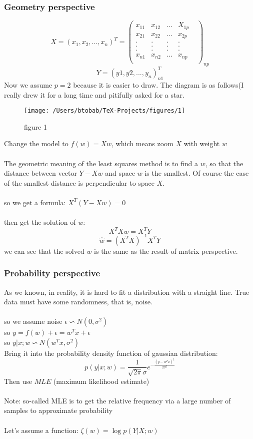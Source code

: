 \documentclass{report}
\begin{document}
\subsubsection{Geometry perspective}
$$
X=(x_1,x_2,...,x_n)^T=\begin{pmatrix}
x_{11}&x_{12}&...&X_{1p}\\
x_{21}&x_{22}&...&x_{2p}\\
.&.&.&.&\\
.&.&.&.&\\
.&.&.&.&\\
x_{n1}&x_{n2}&...&x_{np}\\
\end{pmatrix}_{np}
$$
$$
Y=(y1,y2,...,y_n)_{n1}^T
$$
Now we assume  $p=2$ because it is easier to draw. The diagram is as follows(I really drew it for a long time and pitifully asked for a star.
\begin{figure}
\texttt{[image: /Users/btobab/TeX-Projects/figures/1]}
\caption{figure 1}
\end{figure}
Change the model to $f(w)=Xw$, which means zoom $X$ with weight $w$\\\\
The geometric meaning of the least squares method is to find a $w$, so that the distance between vector $Y-Xw$ and space $w$ is the smallest. Of course the case of the smallest distance is perpendicular to space $X$.\\\\
so we get a formula: $X^T(Y-Xw)=0$\\\\
then get the solution of $w$: 
$$
X^TXw=X^TY
$$
$$
\hat{w}=(X^TX)^{-1}X^TY
$$
we can see that the solved $w$ is the same as the result of matrix perspective.
\subsubsection{Probability perspective}
As we known, in reality, it is hard to fit a distribution with a straight line. True data must have some randomness, that is, noise.\\\\
so we assume noise $\epsilon\backsim N(0,\sigma^2)$\\
so $y=f(w)+\epsilon=w^Tx+\epsilon$\\
so $y|x;w\backsim N(w^Tx,\sigma^2)$\\
Bring it into the probability density function of gaussian distribution:
$$
p(y|x;w)=\frac{1}{\sqrt{2\pi}\sigma}e^{-\frac{(y-w^Tx)^2}{2\sigma^2}}
$$
Then use $MLE$ (maximum likelihood estimate)\\\\
Note: so-called MLE is to get the relative frequency via a large number of samples to approximate probability\\\\
Let's assume a function: $\zeta(w)=\log{p(Y|X;w)}$
\end{document}
